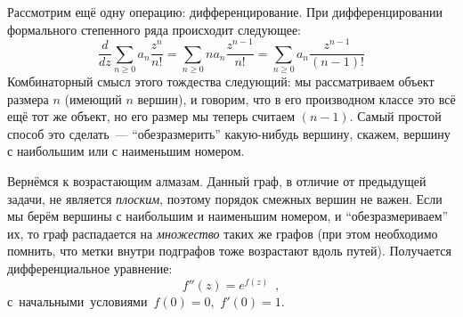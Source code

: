 \documentclass[a5paper]{article}
\theoremstyle{definition}
\begin{document}
Рассмотрим ещё одну операцию: дифференцирование. При дифференцировании
формального степенного ряда происходит следующее:
\begin{equation}
    \dfrac{d}{dz} \sum_{n \geq 0} a_n \dfrac{z^n}{n!} = 
    \sum_{n \geq 0} n a_n \dfrac{z^{n-1}}{n!} = 
    \sum_{n \geq 0} a_n \dfrac{z^{n-1}}{(n-1)!}
\end{equation}
Комбинаторный смысл этого тождества следующий: мы рассматриваем объект размера
\( n \) (имеющий \( n \) вершин), и говорим, что в его производном классе это
всё ещё тот же объект, но его размер мы теперь считаем \( (n-1) \). Самый
простой способ это сделать~--- ``обезразмерить'' какую-нибудь вершину, скажем,
вершину с наибольшим или с наименьшим номером.

\noindent\begin{minipage}{0.6\textwidth}
Вернёмся к возрастающим алмазам. Данный граф, в отличие от предыдущей задачи, не
является \textit{плоским}, поэтому порядок смежных вершин не важен. Если мы
берём вершины с наибольшим и наименьшим номером, и ``обезразмериваем'' их, то
граф распадается на \textit{множество} таких же графов (при этом необходимо
помнить, что метки внутри подграфов тоже возрастают вдоль путей).
Получается дифференциальное уравнение:
\begin{equation}
    f''(z) = e^{f(z)}
    \enspace ,
\end{equation}
\mbox{с начальными условиями \( f(0) = 0 \),~\( f'(0) = 1 \)}.
\end{minipage}%
\hfill%
\begin{minipage}{0.3\textwidth}\raggedleft
{}
\end{minipage}
\end{document}
